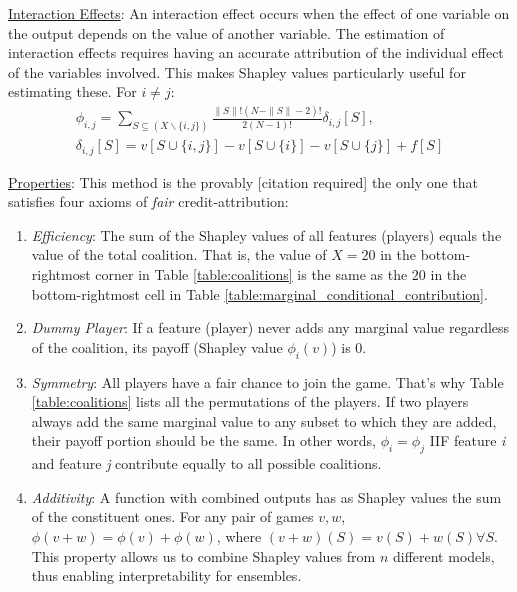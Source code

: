 \underline{Interaction Effects}: An interaction effect occurs when the effect of one variable on the output depends on the value of another variable. The estimation of interaction effects requires having an accurate attribution of the individual effect of the variables involved. This makes Shapley values particularly useful for estimating these. For $i \neq j$:
\begin{align}
    \phi_{i, j}=\sum_{S \subseteq(X \backslash\{i, j\})} \frac{\|S\| !(N-\|S\|-2) !}{2(N-1) !} \delta_{i, j}[S], \nonumber \\
    \delta_{i, j}[S]=v[S \cup\{i, j\}]-v[S \cup\{i\}]-v[S \cup\{j\}]+f[S]
\end{align}

\underline{Properties}:
This method is the provably [citation required] the only one that satisfies four axioms of \emph{fair} credit-attribution:
\begin{enumerate}
    \item \emph{Efficiency}: The sum of the Shapley values of all features (players) equals the value of the total coalition. That is, the value of $X = 20$ in the bottom-rightmost corner in Table \ref{table:coalitions} is the same as the $20$ in the bottom-rightmost cell in Table \ref{table:marginal_conditional_contribution}.
    \item \emph{Dummy Player}: If a feature (player) never adds any marginal value regardless of the coalition, its payoff (Shapley value $\phi_{i}(v)$) is 0.
    \item \emph{Symmetry}: All players have a fair chance to join the game. That’s why Table \ref{table:coalitions} lists all the permutations of the players. If two players always add the same marginal value to any subset to which they are added, their payoff portion should be the same. In other words, $\phi_{i} = \phi_{j}$ IIF feature \emph{i} and feature \emph{j} contribute equally to all possible coalitions.
    \item \emph{Additivity}: A function with combined outputs has as Shapley values the sum of the constituent ones. For any pair of games $v, w$, $\phi(v+w) = \phi(v)+\phi(w)$, where $(v+w)(S)=v(S)+w(S) \forall S$. This property allows us to combine Shapley values from $n$ different models, thus enabling interpretability for ensembles. 
\end{enumerate}

